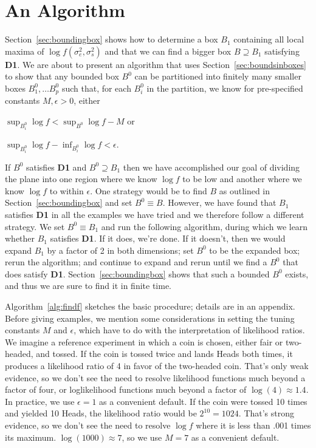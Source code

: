 \documentclass[ejs]{imsart}
\newcommand{\RL}{f}
\newcommand{\logRL}{\log\RL}
\newcommand{\sigssq}{\sigma_s^2}
\newcommand{\sigesq}{\sigma_e^2}
\newcommand{\logRLss}{\logRL(\sigesq,\sigssq)}
\begin{document}
\section{An Algorithm}
\label{sec:algorithm}
Section~\ref{sec:boundingbox} shows how to determine a box $B_1$ containing all local maxima of $\logRLss$ and   that we can find a bigger box $B\supseteq B_1$ satisfying \textbf{D1}.  We are about to present an algorithm that uses Section~\ref{sec:boundsinboxes} to show that any bounded box $B^0$ can be partitioned into finitely many smaller boxes $B^0_1, \dots B^0_p$  such that, for each $B^0_i$ in the partition, we know for pre-specified constants $M, \epsilon >0$, either
\begin{enumerate*}[label=(\alph*)]
\item $\sup_{B^0_i} \logRL < \sup_{B^0} \logRL -M$ or
\item $\sup_{B^0_i} \logRL - \inf_{B^0_i} \logRL < \epsilon$.
\end{enumerate*}
If $B^0$ satisfies \textbf{D1} and $B^0\supseteq B_1$ then we have accomplished our goal of dividing the plane into one region where we know $\logRL$ to be low and another where we know $\logRL$ to within $\epsilon$.  One strategy would be to find $B$ as outlined in Section~\ref{sec:boundingbox} and set $B^0 \equiv B$.  However, we have found that $B_1$ satisfies \textbf{D1} in all the examples we have tried and we therefore follow a different strategy.  We set $B^0 \equiv B_1$ and run the following algorithm, during which we learn whether $B_1$ satisfies \textbf{D1}.  If it does, we're done.  If it doesn't, then we would expand $B_1$ by a factor of 2 in both dimensions; set $B^0$ to be the expanded box; rerun the algorithm; and continue to expand and rerun until we find a $B^0$ that does satisfy \textbf{D1}.  Section~\ref{sec:boundingbox} shows that such a bounded $B^0$ exists, and thus we are sure to find it in finite time.

Algorithm~\ref{alg:findf} sketches the basic procedure; details are in an appendix.  Before giving examples, we mention some considerations in setting the tuning constants $M$ and $\epsilon$, which have to do with the interpretation of likelihood ratios.  We imagine a reference experiment in which a coin is chosen, either fair or two-headed, and tossed.  If the coin is tossed twice and lands Heads both times, it produces a likelihood ratio of 4 in favor of the two-headed coin.  That's only weak evidence, so we don't see the need to resolve likelihood functions much beyond a factor of four, or loglikelihood functions much beyond a factor of $\log(4) \approx 1.4$.  In practice, we use $\epsilon = 1$ as a convenient default.  If the coin were tossed 10 times and yielded 10 Heads, the likelihood ratio would be $2^{10} = 1024$.  That's strong evidence, so we don't see the need to resolve $\logRL$ where it is less than .001 times its maximum.  $\log(1000) \approx 7$, so we use $M = 7$ as a convenient default.
\end{document}
